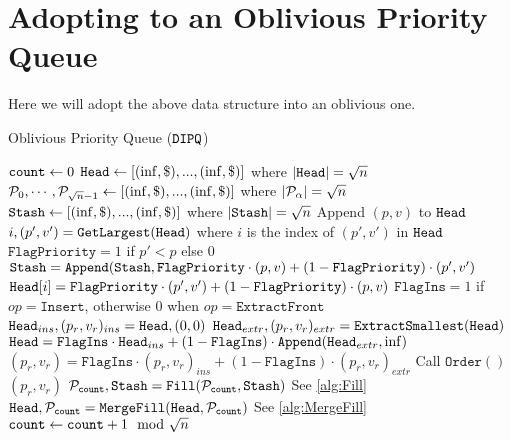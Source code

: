 \section{Adopting to an Oblivious Priority Queue}
Here we will adopt the above data structure into an oblivious one.

\newcommand{\DIPQOperation}{\texttt{Access}}
\newcommand{\experiment}{\textbf{Exp}}
\newcommand{\Append}{\texttt{Append}}
	
\begin{algorithm}
	\caption{Oblivious Priority Queue ($\texttt{DIPQ}$)}
	\label{alg:ObvQueue}
	\begin{algorithmic}[1]
		\Function{$\DIPQInit$}{}
		\State ${\texttt{count}} \gets 0$
		\State $\texttt{Head} \gets [(\inf, \$), ..., (\inf, \$)]$ where $|\texttt{Head}| = {\sqrt{n}}$
		\State $\mathcal{P}_0, \cdots, \mathcal{P}_{{\sqrt{n}}-1} \gets [(\inf, \$), ..., (\inf, \$)]$ where $|\mathcal{P}_\alpha| = {\sqrt{n}}$
		\State $\texttt{Stash} \gets [(\inf, \$), ..., (\inf, \$)]$ where $|\texttt{Stash}| = {\sqrt{n}}$
		\EndFunction
		\Function{$\DIPQOperation$}{$p, v, op$}
			\State Append $(p, v)$ to $\texttt{Head}$
			\State $i, (p', v') = \texttt{GetLargest}(\texttt{Head})$ where $i$ is the index of $(p', v')$ in $\texttt{Head}$
			\State $\texttt{FlagPriority} = 1$ if $p' < p$ else $0$
			\State $\DIPQstash =  \Append(\DIPQstash, \texttt{FlagPriority} \cdot (p, v) + (1 - \texttt{FlagPriority}) \cdot (p', v')$
			\State $\texttt{Head}[i] = \texttt{FlagPriority} \cdot (p', v') + (1 - \texttt{FlagPriority}) \cdot (p, v)$
			\State $\texttt{FlagIns} = 1$ if $op = \texttt{Insert}$, otherwise $0$ when $op = \texttt{ExtractFront}$
			\State $\texttt{Head}_{ins}, (p_r, v_r)_{ins} =  \texttt{Head}, (0, 0)$
			\State $\texttt{Head}_{extr}, (p_r, v_r)_{extr} =  \texttt{ExtractSmallest}(\texttt{Head})$
			\State $\DIPQhead = \texttt{FlagIns} \cdot \DIPQhead_{ins} + (1 - \texttt{FlagIns}) \cdot \Append(\DIPQhead_{extr}, \inf)$
			\State $(p_r, v_r) = \texttt{FlagIns} \cdot (p_r, v_r)_{ins} + (1 - \texttt{FlagIns}) \cdot (p_r, v_r)_{extr}$
			\State Call $\texttt{Order}()$ \label{algline:ObvPQOrderOp}
			\State \Return $(p_r, v_r)$
		\EndFunction
		\Function{$\DIPQOrder$}{}
			\State $\mathcal{P}_{{\texttt{count}}}, \texttt{Stash} = \texttt{Fill}(\mathcal{P}_{\texttt{count}}, \texttt{Stash})$ \Comment See \cref{alg:Fill}
			\State $\texttt{Head}, \mathcal{P}_{\texttt{count}} = \texttt{MergeFill}(\texttt{Head}, \mathcal{P}_{\texttt{count}})$ \Comment See \cref{alg:MergeFill}
			\State ${\texttt{count}} \gets {\texttt{count}} + 1 \mod {{\sqrt{n}}}$
		\EndFunction
	\end{algorithmic}
\end{algorithm}


